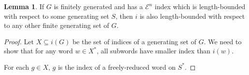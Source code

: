 \documentclass[a4paper]{article}
\newcommand{\grz}[1]{$\mathcal{E}^{#1}$}
\theoremstyle{plain}
\theoremstyle{definition}
\newtheorem{lemma}[theorem]{Lemma}
\begin{document}
\begin{lemma}
	If $G$ is finitely generated and has a \grz{n} index which is length-bounded with respect to some generating set $S$, then $i$ is also length-bounded with respect to any other finite generating set of $G$.
\end{lemma}
\begin{proof}
	Let $X \subseteq i(G)$ be the set of indices of a generating set of $G$. We need to show that for any word $w \in X^{\ast}$, all subwords have smaller index than $i(w)$. 
	
	For each $g \in X$, $g$ is the index of a freely-reduced word on $S^{\ast}$.
\end{proof}
\end{document}

